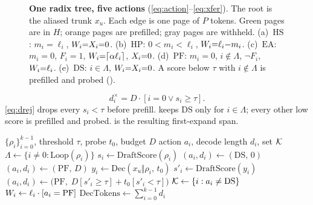 \begin{figure}[t]
\centering
\resizebox{\textwidth}{!}{}
\caption{\textbf{One radix tree, five actions} (\eqref{eq:action}--\eqref{eq:xfer}).
The root is the aliased trunk $x_u$.
Each edge is one page of $P$ tokens.
Green pages are in $H$; orange pages are prefilled; gray pages are withheld.
(a)~$\mathrm{HS}$: $m_i{=}\ell_i$, $W_i{=}X_i{=}0$.
(b)~$\mathrm{HP}$: $0{<}m_i{<}\ell_i$, $W_i{=}\ell_i{-}m_i$.
(c)~$\mathrm{EA}$: $m_i{=}0$, $F_i{=}1$, $W_i{=}\lceil\alpha\ell_i\rceil$, $X_i{=}0$.
(d)~$\mathrm{PF}$: $m_i{=}0$, $i{\notin}\Lambda$, $\neg F_i$, $W_i{=}\ell_i$.
(e)~$\mathrm{DS}$: $i{\in}\Lambda$, $W_i{=}X_i{=}0$.
A score below $\tau$ with $i{\notin}\Lambda$ is prefilled and probed ().}
\label{fig:radix}
\end{figure}
\begin{equation}
\label{eq:drej-iv}
d_i^{\times}=D\cdot[i=0\lor s_i\ge\tau].
\end{equation}
\eqref{eq:drej} drops every $s_i{<}\tau$ before prefill.
 keeps $\mathrm{DS}$ only for $i{\in}\Lambda$; every other low score is prefilled and probed.
 is the resulting first-expand span.

\begin{algorithm}[t]
\caption{Cold-index restriction of : every $m_i{=}0$.
Probe admission, replacing \eqref{eq:drej}.
$\Lambda$ is the repeated-loop set.
$y_i$ is a probe of $t_0$ tokens and $s'_i$ is its draft score.
Iverson brackets select the decode length.
$\mathrm{DS}$ applies only to $\Lambda$.}
\label{alg:probe}
\small
\begin{algorithmic}[1]
\REQUIRE $\{\rho_i\}_{i=0}^{k-1}$, threshold $\tau$, probe $t_0$, budget $D$
\ENSURE action $a_i$, decode length $d_i$, set $\mathcal{K}$
\STATE $\Lambda\leftarrow\{i\neq 0:\mathrm{Loop}(\rho_i)\}$
  \STATE $s_i\leftarrow\mathrm{DraftScore}(\rho_i)$
    \STATE $(a_i,d_i)\leftarrow(\mathrm{DS},\,0)$ 
    \STATE $(a_i,d_i)\leftarrow(\mathrm{PF},\,D)$
  \ELSE
    \STATE $y_i\leftarrow\mathrm{Dec}(x_u\Vert\rho_i,\,t_0)$
    \STATE $s'_i\leftarrow\mathrm{DraftScore}(y_i)$
    \STATE $(a_i,d_i)\leftarrow\big(\mathrm{PF},\; D[s'_i\ge\tau]+t_0[s'_i<\tau]\big)$
  \ENDIF
\ENDFOR
\STATE $\mathcal{K}\leftarrow\{i:a_i\neq\mathrm{DS}\}$
\STATE $W_i\leftarrow\ell_i\cdot[a_i=\mathrm{PF}]$
\STATE $\mathrm{DecTokens}\leftarrow\sum_{i=0}^{k-1} d_i$
\end{algorithmic}
\end{algorithm}

